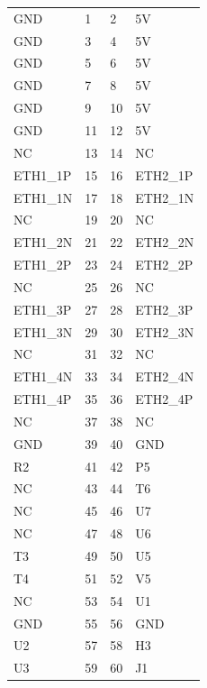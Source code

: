 \documentclass[12pt]{article}
\begin{document}
\begin{longtable}{P{2.5cm}P{1.5cm}P{1.5cm}P{2.5cm}}
 GND    & 1  & 2  & 5V \\
 GND    & 3  & 4  & 5V \\
 GND    & 5  & 6  & 5V \\
 GND    & 7  & 8  & 5V \\
 GND    & 9  & 10 & 5V \\
 GND    & 11 & 12 & 5V \\
 NC     & 13 & 14 & NC \\
 ETH1\_1P & 15 & 16 & ETH2\_1P \\
 ETH1\_1N & 17 & 18 & ETH2\_1N \\
 NC     & 19 & 20 & NC \\
 ETH1\_2N & 21 & 22 & ETH2\_2N \\
 ETH1\_2P & 23 & 24 & ETH2\_2P \\
 NC     & 25 & 26 & NC \\
 ETH1\_3P & 27 & 28 & ETH2\_3P \\
 ETH1\_3N & 29 & 30 & ETH2\_3N \\
 NC     & 31 & 32 & NC \\
 ETH1\_4N & 33 & 34 & ETH2\_4N \\
 ETH1\_4P & 35 & 36 & ETH2\_4P \\
 NC     & 37 & 38 & NC \\
 GND    & 39 & 40 & GND \\
 R2     & 41 & 42 & P5 \\
 NC     & 43 & 44 & T6 \\
 NC     & 45 & 46 & U7 \\
 NC     & 47 & 48 & U6 \\
 T3     & 49 & 50 & U5 \\
 T4     & 51 & 52 & V5 \\
 NC     & 53 & 54 & U1 \\
 GND    & 55 & 56 & GND \\
 U2     & 57 & 58 & H3 \\
 U3     & 59 & 60 & J1 \\

\end{longtable}
\end{document}
